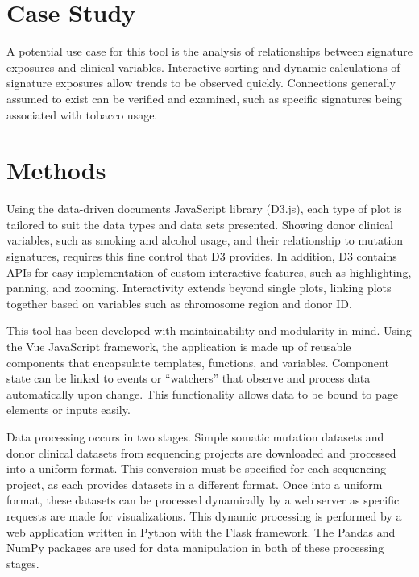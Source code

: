 \documentclass[12pt, letterpaper]{article}
\begin{document}
\section{Case Study}
A potential use case for this tool is the analysis of relationships between signature exposures and clinical variables.
Interactive sorting and dynamic calculations of signature exposures allow trends to be observed quickly.
Connections generally assumed to exist can be verified and examined, such as specific signatures being associated with tobacco usage.



\section{Methods}
Using the data-driven documents JavaScript library (D3.js)\cite{bostock2011d3}, each type of plot is tailored to suit the data types and data sets presented.
Showing donor clinical variables, such as smoking and alcohol usage, and their relationship to mutation signatures, requires this fine control that D3 provides.
In addition, D3 contains APIs for easy implementation of custom interactive features, such as highlighting, panning, and zooming.
Interactivity extends beyond single plots, linking plots together based on variables such as chromosome region and donor ID.


This tool has been developed with maintainability and modularity in mind.
Using the Vue JavaScript framework, the application is made up of reusable components that encapsulate templates, functions, and variables.
Component state can be linked to events or ``watchers'' that observe and process data automatically upon change.
This functionality allows data to be bound to page elements or inputs easily.

Data processing occurs in two stages. 
Simple somatic mutation datasets and donor clinical datasets from sequencing projects are downloaded and processed into a uniform format. 
This conversion must be specified for each sequencing project, as each provides datasets in a different format.
Once into a uniform format, these datasets can be processed dynamically by a web server as specific requests are made for visualizations.
This dynamic processing is performed by a web application written in Python with the Flask framework. 
The Pandas and NumPy packages are used for data manipulation in both of these processing stages.
\end{document}

